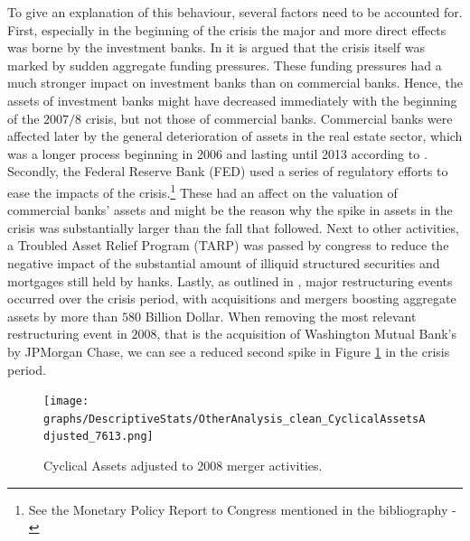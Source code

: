 \documentclass[12pt, a4paper]{article} %
\begin{document}

To give an explanation of this behaviour, several factors need to be accounted for. First, especially in the beginning of the crisis the major and more direct effects was borne by the investment banks. In \citet{antoniades2019commercial} it is argued that the crisis itself was marked by sudden aggregate funding pressures. These funding pressures had a much stronger impact on investment banks than on commercial banks. Hence, the assets of investment banks might have decreased immediately with the beginning of the $2007/8$ crisis, but not those of commercial banks. Commercial banks were affected later by the general deterioration of assets in the real estate sector, which was a longer process beginning in 2006 and lasting until 2013 according to \citet{antoniades2019commercial}.
Secondly, the Federal Reserve Bank (FED) used a series of regulatory efforts to ease the impacts of the crisis.\footnote{See the Monetary Policy Report to Congress mentioned in the bibliography - \citep{FEDReport}} These had an affect on the valuation of commercial banks' assets and might be the reason why the spike in assets in the crisis was substantially larger than the fall that followed. Next to other activities, a Troubled Asset Relief Program (TARP) was passed by congress to reduce the negative impact of the substantial amount of  illiquid  structured  securities  and  mortgages  still held  by  hanks. 
Lastly, as outlined in \citet{bech2009profits}, major restructuring events occurred over the crisis period, with acquisitions and mergers boosting aggregate assets by more than $580$ Billion Dollar. When removing the most relevant restructuring event in $2008$, that is the acquisition of  Washington Mutual  Bank's  by JPMorgan Chase, we can see a reduced second spike in Figure \ref{fig:cyclial_assets_adjusted} in the crisis period. 

\begin{figure}[H]
\begin{minipage}{\textwidth}
\texttt{[image: graphs/DescriptiveStats/OtherAnalysis\_clean\_CyclicalAssetsAdjusted\_7613.png]}
\caption[1]{Cyclical Assets adjusted to 2008 merger activities.}
\label{fig:cyclial_assets_adjusted}
\end{minipage}
\end{figure}
\end{document}
